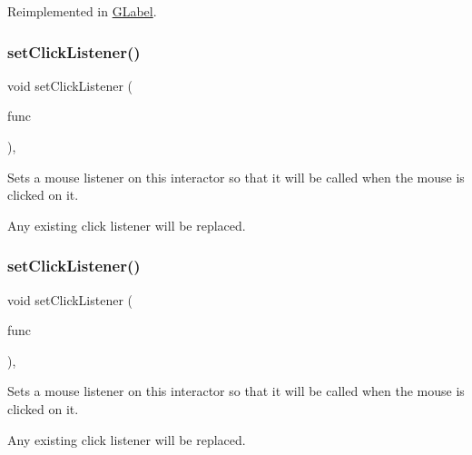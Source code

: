Reimplemented in \mbox{\hyperlink{classGLabel_adb836652705fdc4b7e90b7a3afc56a37}{G\+Label}}.

\mbox{\label{classGInteractor_abd40af6921242584d0954f173911b190}} 
\subsubsection{\texorpdfstring{set\+Click\+Listener()}{setClickListener()}\hspace{0.1cm}{\footnotesize\ttfamily [1/2]}}
{\footnotesize\ttfamily void set\+Click\+Listener (\begin{DoxyParamCaption}\item[{G\+Event\+Listener}]{func }\end{DoxyParamCaption})\hspace{0.3cm}{\ttfamily [virtual]}, {\ttfamily [inherited]}}



Sets a mouse listener on this interactor so that it will be called when the mouse is clicked on it. 

Any existing click listener will be replaced. \mbox{\label{classGInteractor_a856414c92df90f56f3877475eb3f8fc4}} 
\subsubsection{\texorpdfstring{set\+Click\+Listener()}{setClickListener()}\hspace{0.1cm}{\footnotesize\ttfamily [2/2]}}
{\footnotesize\ttfamily void set\+Click\+Listener (\begin{DoxyParamCaption}\item[{G\+Event\+Listener\+Void}]{func }\end{DoxyParamCaption})\hspace{0.3cm}{\ttfamily [virtual]}, {\ttfamily [inherited]}}



Sets a mouse listener on this interactor so that it will be called when the mouse is clicked on it. 

Any existing click listener will be replaced. \mbox{\label{classGInteractor_ab1f5cc0f5cc6bbbd716a526c61f1081d}} 
